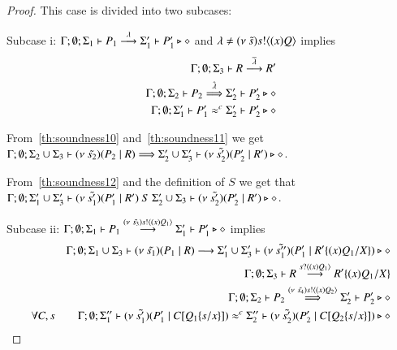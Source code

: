 \begin{proof}


	This case is divided into two subcases:

	\noi Subcase i: $\Gamma; \emptyset; \Sigma_1 \vdash P_1 \stackrel{\lambda}{\longrightarrow} \Sigma_1' \vdash P_1' \triangleright \diamond$ 
	and $\lambda \not= (\nu\ \tilde{s}) s ! \langle (x)Q \rangle$ implies
	\begin{eqnarray}
		\Gamma; \emptyset; \Sigma_3 \vdash R \stackrel{\overline{\lambda}}{\longrightarrow} R' \label{th:soundness10} \\
		\Gamma; \emptyset; \Sigma_2 \vdash P_2 \stackrel{\hat{\lambda}}{\Longrightarrow} \Sigma_2' \vdash P_2' \triangleright \diamond \label{th:soundness11}\\
		\Gamma; \emptyset; \Sigma_1' \vdash P_1' \approx^{c} \Sigma_2' \vdash P_2' \triangleright \diamond \label{th:soundness12}
	\end{eqnarray}

	From~\ref{th:soundness10} and~\ref{th:soundness11} we get
	$\Gamma; \emptyset; \Sigma_2 \cup \Sigma_3 \vdash (\nu\ \tilde{s_2})(P_2 \;|\; R) \stackrel{}{\Longrightarrow} \Sigma_2' \cup \Sigma_3' \vdash (\nu\ \tilde{s_2'})(P_2' \;|\; R') \triangleright \diamond$.

	From~\ref{th:soundness12} and the definition of $S$ we get that
	$\Gamma; \emptyset; \Sigma_1' \cup \Sigma_3' \vdash (\nu\ \tilde{s_1'})(P_1' \;|\; R')\ S\ \Sigma_2' \cup \Sigma_3 \vdash (\nu\ \tilde{s_2'})(P_2' \;|\; R') \triangleright \diamond$.

	\noi Subcase ii: $\Gamma; \emptyset; \Sigma_1 \vdash P_1 \stackrel{(\nu\ \tilde{s_3}) s ! \langle (x)Q_1 \rangle}{\longrightarrow} \Sigma_1' \vdash P_1' \triangleright \diamond$ implies
	\begin{eqnarray}
		& & \Gamma; \emptyset; \Sigma_1 \cup \Sigma_3 \vdash (\nu\ \tilde{s_1})(P_1 \;|\; R) \stackrel{}{\longrightarrow} \Sigma_1' \cup \Sigma_3' \vdash (\nu\ \tilde{s_1''})(P_1' \;|\; R' \{(x)Q_1/X \}) \triangleright \diamond\\
		& & \Gamma; \emptyset; \Sigma_3 \vdash R \stackrel{s ? \langle (x)Q_1 \rangle}{\longrightarrow} R' \{(x)Q_1/X \} \label{th:soundness7}\\
		& & \Gamma; \emptyset; \Sigma_2 \vdash P_2 \stackrel{(\nu\ \tilde{s_4}) s ! \langle (x)Q_2 \rangle}{\Longrightarrow} \Sigma_2' \vdash P_2' \triangleright \diamond \label{th:soundness8}\\
		\forall C, s & & \Gamma; \emptyset; \Sigma_1'' \vdash (\nu\ \tilde{s_1'})(P_1' \;|\; C[Q_1 \{s/x \}]) \approx^{c} \Sigma_2'' \vdash (\nu\ \tilde{s_2'})(P_2' \;|\; C[Q_2 \{s/x \}]) \triangleright \diamond \label{th:soundness9}
	\end{eqnarray}


\end{proof}
